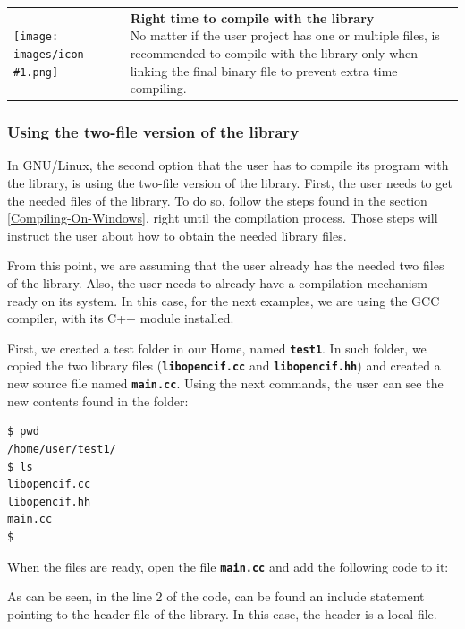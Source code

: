\documentclass[11pt,twoside,openany,x11names,svgnames]{memoir}
\makeatletter
\newcommand{\IconNote}[3]
{
	\begin{table}[ht]
	\begin{tabular}{ lm{\dimexpr\textwidth-8\tabcolsep-\wd0}@{}}
		\toprule
		\texttt{[image: images/icon-\#1.png]}
		&
		\parbox[t]{155mm}{
		\textbf{#2} \\
		#3
		}
	\end{tabular}
\end{table}
}
\makeatother
\begin{document}
\IconNote
	{info}
	{Right time to compile with the library}
	{No matter if the user project has one or multiple files, is recommended to compile with the library only when linking the final binary file to prevent extra time compiling.}
	
\subsubsection{Using the two-file version of the library}\label{Using-the-two-file-version-of-the-library}

In GNU/Linux, the second option that the user has to compile its program with the library, is using the two-file version of the library. First, the user needs to get the needed files of the library. To do so, follow the steps found in the section \ref{Compiling-On-Windows}, right until the compilation process. Those steps will instruct the user about how to obtain the needed library files.

From this point, we are assuming that the user already has the needed two files of the library. Also, the user needs to already have a compilation mechanism ready on its system. In this case, for the next examples, we are using the GCC compiler, with its C++ module installed.

First, we created a test folder in our Home, named \textbf{\texttt{test1}}. In such folder, we copied the two library files (\textbf{\texttt{libopencif.cc}} and \textbf{\texttt{libopencif.hh}}) and created a new source file named \textbf{\texttt{main.cc}}. Using the next commands, the user can see the new contents found in the folder:

\begin{lstlisting}[frame=single,style=SystemCommandStyle]
$ pwd
/home/user/test1/
$ ls
libopencif.cc
libopencif.hh
main.cc
$
\end{lstlisting}

When the files are ready, open the file \textbf{\texttt{main.cc}} and add the following code to it:



As can be seen, in the line 2 of the code, can be found an include statement pointing to the  header file of the library. In this case, the header is a local file.
\end{document}
